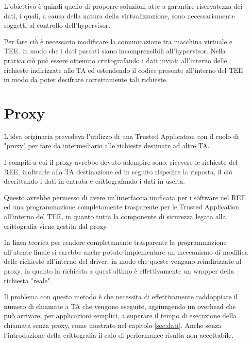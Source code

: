 \documentclass[12pt,italian]{report}
\begin{document}
	L'obiettivo è quindi quello di proporre soluzioni atte a garantire riservatezza dei dati, i quali, a causa della natura della virtualizzazione, sono necessariamente soggetti al controllo dell'hypervisor.
	
	\bigbreak
	
	Per fare ciò è necessario modificare la comunicazione tra macchina virtuale e TEE, in modo che i dati passati siano incomprensibili all'hypervisor. Nella pratica ciò può essere ottenuto crittografando i dati inviati all'interno delle richieste indirizzate alle TA ed estendendo il codice presente all'interno del TEE in modo da poter decifrare correttamente tali richieste. 
	
	\section{Proxy}
	\label{sec:proxy}
	L'idea originaria prevedeva l'utilizzo di una Trusted Application con il ruolo di "proxy" per fare da intermediario alle richieste destinate ad altre TA. 
	
	I compiti a cui il proxy avrebbe dovuto adempire sono: ricevere le richieste del REE, inoltrarle alla TA destinazione ed in seguito rispedire la risposta, il ciò decrittando i dati in entrata e crittografando i dati in uscita.
	
	\bigbreak
	
	Questo avrebbe permesso di avere un'interfaccia unificata per i software nel REE ed una programmazione completamente trasparente per le Trusted Application all'interno del TEE, in quanto tutta la componente di sicurezza legata alla crittografia viene gestita dal proxy. 
	
	In linea teorica per rendere completamente trasparente la programmazione all'utente finale si sarebbe anche potuto implementare un meccanismo di modifica delle richieste all'interno del driver, in modo che queste vengano reindirizzate al proxy, in quanto la richiesta a quest'ultimo è effettivamente un wrapper della richiesta "reale".
	
	\bigbreak
	
	Il problema con questo metodo è che necessita di effettivamente raddoppiare il numero di chiamate a TA che vengono eseguite, aggiungendo un overhead che può arrivare, per applicazioni semplici, a superare il tempo di esecuzione della chiamata senza proxy, come mostrato nel capitolo \ref{sec:dati}. Anche senza l'introduzione della crittografia il calo di performance risulta non accettabile.
	
\end{document}
